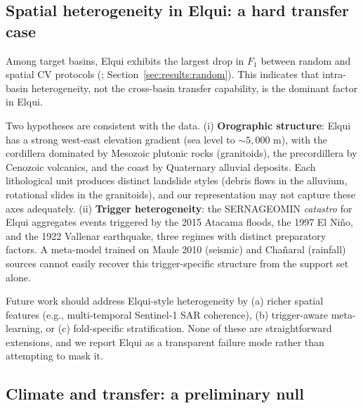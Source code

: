 \subsection{Spatial heterogeneity in Elqui: a hard transfer case}
\label{sec:disc:elqui}

Among target basins, Elqui exhibits the largest drop in $F_1$ between random and spatial CV protocols (; Section~\ref{sec:results:random}).  This indicates that intra-basin heterogeneity, not the cross-basin transfer capability, is the dominant factor in Elqui.

Two hypotheses are consistent with the data. (i) \textbf{Orographic structure}: Elqui has a strong west-east elevation gradient (sea level to $\sim 5{,}000$ m), with the cordillera dominated by Mesozoic plutonic rocks (granitoids), the precordillera by Cenozoic volcanics, and the coast by Quaternary alluvial deposits. Each lithological unit produces distinct landslide styles (debris flows in the alluvium, rotational slides in the granitoids), and our  representation may not capture these axes adequately. (ii) \textbf{Trigger heterogeneity}: the SERNAGEOMIN \emph{catastro} for Elqui aggregates events triggered by the 2015 Atacama floods, the 1997 El Ni\~no, and the 1922 Vallenar earthquake, three regimes with distinct preparatory factors. A meta-model trained on Maule 2010 (seismic) and Cha\~naral (rainfall) sources cannot easily recover this trigger-specific structure from the support set alone.

Future work should address Elqui-style heterogeneity by (a) richer spatial features (e.g., multi-temporal Sentinel-1 SAR coherence), (b) trigger-aware meta-learning, or (c) fold-specific stratification. None of these are straightforward extensions, and we report Elqui as a transparent failure mode rather than attempting to mask it.

\subsection{Climate and transfer: a preliminary null}
\label{sec:disc:climate}


